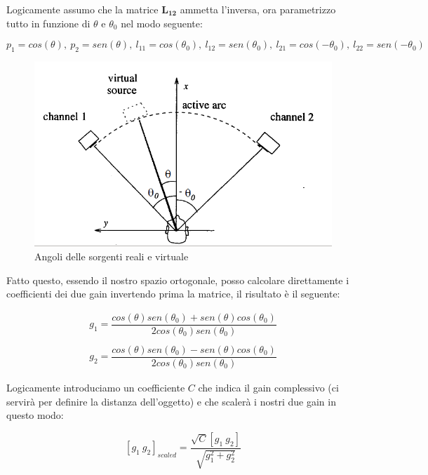 \documentclass[12pt,a4paper]{report}
\begin{document}
\begin{itemize}
Logicamente assumo che la matrice $\boldsymbol{L_{12}}$ ammetta l'inversa, ora parametrizzo tutto in funzione di $\theta$ e $\theta_0$ nel modo seguente:

\[ p_1=cos(\theta),\ p_2=sen(\theta),\ l_{11}=cos(\theta_0),\ l_{12}=sen(\theta_0),\ l_{21}=cos(-\theta_0),\ l_{22}=sen(-\theta_0) \]

\begin{figure}[htbp]
	\centering
	\includegraphics[scale=0.45]{figures/angoli.png}
	\caption {Angoli delle sorgenti reali e virtuale}
	\label{fig:angoli}
	\end{figure}

Fatto questo, essendo il nostro spazio ortogonale, posso calcolare direttamente i coefficienti dei due gain invertendo prima la matrice, il risultato è il seguente:

\begin{equation}\begin{split}
g_1=\dfrac{cos(\theta) sen(\theta_0) + sen (\theta) cos(\theta_0)}{2 cos(\theta_0) sen(\theta_0)}\\ \\
g_2=\dfrac{cos(\theta) sen(\theta_0) - sen (\theta) cos(\theta_0)}{2 cos(\theta_0) sen(\theta_0)}
\end{split}
\label{eq:eeee}
\end{equation}

Logicamente introduciamo un coefficiente $C$ che indica il gain complessivo (ci servirà per definire la distanza dell'oggetto) e che scalerà i nostri due gain in questo modo:

\begin{equation}
\left[g_1 \ g_2\right]_{scaled} = \dfrac{\sqrt{C} \left[ g_1 \ g_2 \right]}{\sqrt{g_1^2 + g_2^2}}
\label{eq:ffff}
\end{equation}


\end{itemize}
\end{document}
